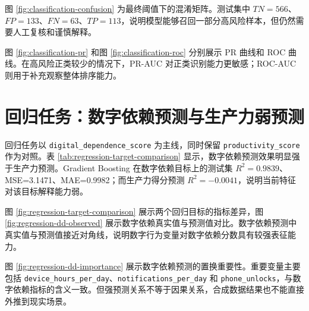 图 \ref{fig:classification-confusion} 为最终阈值下的混淆矩阵。测试集中 $TN=566$、$FP=133$、$FN=63$、$TP=113$，说明模型能够召回一部分高风险样本，但仍然需要人工复核和谨慎解释。


图 \ref{fig:classification-pr} 和图 \ref{fig:classification-roc} 分别展示 PR 曲线和 ROC 曲线。在高风险正类较少的情况下，PR-AUC 对正类识别能力更敏感；ROC-AUC 则用于补充观察整体排序能力。



\section{回归任务：数字依赖预测与生产力弱预测}

回归任务以 \texttt{digital\_dependence\_score} 为主线，同时保留 \texttt{productivity\_score} 作为对照。表 \ref{tab:regression-target-comparison} 显示，数字依赖预测效果明显强于生产力预测。Gradient Boosting 在数字依赖目标上的测试集 $R^2=0.9839$、MSE=3.1471、MAE=0.9982；而生产力得分预测 $R^2=-0.0041$，说明当前特征对该目标解释能力弱。





图 \ref{fig:regression-target-comparison} 展示两个回归目标的指标差异，图 \ref{fig:regression-dd-observed} 展示数字依赖真实值与预测值对比。数字依赖预测中真实值与预测值接近对角线，说明数字行为变量对数字依赖分数具有较强表征能力。



图 \ref{fig:regression-dd-importance} 展示数字依赖预测的置换重要性。重要变量主要包括 \texttt{device\_hours\_per\_day}、\texttt{notifications\_per\_day} 和 \texttt{phone\_unlocks}，与数字依赖指标的含义一致。但强预测关系不等于因果关系，合成数据结果也不能直接外推到现实场景。



